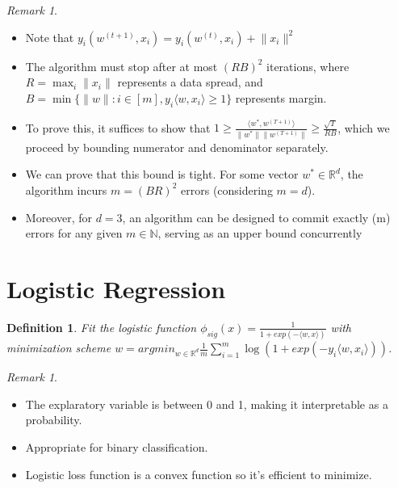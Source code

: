 \documentclass{article}
\newtheorem{definition}{Definition}
\theoremstyle{remark}
\newtheorem{remark}[example]{Remark}
\begin{document}
\begin{remark}
\begin{itemize}
\item Note that $y_i(w^{(t+1)}, x_i)=y_i(w^{(t)}, x_i)+\lVert x_i\rVert^2$
\item The algorithm must stop after at most $(RB)^2$ iterations, where $R=\max_i\lVert x_i\rVert$ represents a data spread, and \\
$B=\min\{\lVert w\rVert: i\in [m], y_i\langle w,x_i\rangle\geq 1\}$ represents 
margin.
\item To prove this, it suffices to show that $1\geq\frac{\langle w^*, w^{(T+1)}\rangle}{\lVert w^*\rVert\lVert w^{(T+1)}\rVert}\geq\frac{\sqrt T}{RB}$, which we proceed by bounding numerator and denominator separately.
\item We can prove that this bound is tight. For some vector $w^* \in \mathbb{R}^d$, the algorithm incurs $m = (BR)^2$ errors (considering $m = d$).
\item Moreover, for $d = 3$, an algorithm can be designed to commit exactly (m) errors for any given $m \in \mathbb{N}$, serving as an upper bound concurrently        \end{itemize}
\end{remark}

\section*{Logistic Regression}
\begin{definition}
Fit the logistic function $\phi_{sig}(x)=\frac 1{1+exp(-\langle w,x\rangle)}$ with minimization scheme $w=argmin_{w\in\mathbb{R}^d} \frac 1m\sum^m_{i=1} \log(1+exp(-y_i\langle w,x_i\rangle))$.
\end{definition}
\begin{remark}
\begin{itemize}
\item The explaratory variable is between 0 and 1, making it interpretable as a probability.
\item Appropriate for binary classification.
\item Logistic loss function is a convex function so it's efficient to minimize.
\end{itemize}
\end{remark}
\end{document}
